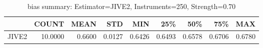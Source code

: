 \begin{table}[ht]
\centering
\caption{bias summary: Estimator=JIVE2, Instruments=250, Strength=0.70}
\begin{tabular}{lrrrrrrrr}
\toprule
 & COUNT & MEAN & STD & MIN & 25\% & 50\% & 75\% & MAX \\
\midrule
JIVE2 & 10.0000 & 0.6600 & 0.0127 & 0.6426 & 0.6493 & 0.6578 & 0.6706 & 0.6780 \\
\bottomrule
\end{tabular}
\end{table}
